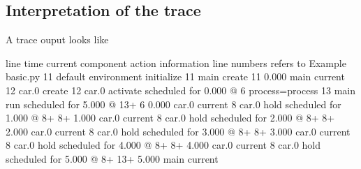 \documentclass[letterpaper,10pt,english]{sphinxmanual}
\begin{document}
\subsection{Interpretation of the trace}
\label{\detokenize{Miscellaneous:interpretation-of-the-trace}}
A trace ouput looks like

\begin{sphinxVerbatim}[commandchars=\\\{\}]
line\PYGZsh{}         time current component    action                               information
\PYGZhy{}\PYGZhy{}\PYGZhy{}\PYGZhy{}\PYGZhy{}   \PYGZhy{}\PYGZhy{}\PYGZhy{}\PYGZhy{}\PYGZhy{}\PYGZhy{}\PYGZhy{}\PYGZhy{}\PYGZhy{}\PYGZhy{} \PYGZhy{}\PYGZhy{}\PYGZhy{}\PYGZhy{}\PYGZhy{}\PYGZhy{}\PYGZhy{}\PYGZhy{}\PYGZhy{}\PYGZhy{}\PYGZhy{}\PYGZhy{}\PYGZhy{}\PYGZhy{}\PYGZhy{}\PYGZhy{}\PYGZhy{}\PYGZhy{}\PYGZhy{}\PYGZhy{} \PYGZhy{}\PYGZhy{}\PYGZhy{}\PYGZhy{}\PYGZhy{}\PYGZhy{}\PYGZhy{}\PYGZhy{}\PYGZhy{}\PYGZhy{}\PYGZhy{}\PYGZhy{}\PYGZhy{}\PYGZhy{}\PYGZhy{}\PYGZhy{}\PYGZhy{}\PYGZhy{}\PYGZhy{}\PYGZhy{}\PYGZhy{}\PYGZhy{}\PYGZhy{}\PYGZhy{}\PYGZhy{}\PYGZhy{}\PYGZhy{}\PYGZhy{}\PYGZhy{}\PYGZhy{}\PYGZhy{}\PYGZhy{}\PYGZhy{}\PYGZhy{}\PYGZhy{}  \PYGZhy{}\PYGZhy{}\PYGZhy{}\PYGZhy{}\PYGZhy{}\PYGZhy{}\PYGZhy{}\PYGZhy{}\PYGZhy{}\PYGZhy{}\PYGZhy{}\PYGZhy{}\PYGZhy{}\PYGZhy{}\PYGZhy{}\PYGZhy{}\PYGZhy{}\PYGZhy{}\PYGZhy{}\PYGZhy{}\PYGZhy{}\PYGZhy{}\PYGZhy{}\PYGZhy{}\PYGZhy{}\PYGZhy{}\PYGZhy{}\PYGZhy{}\PYGZhy{}\PYGZhy{}\PYGZhy{}\PYGZhy{}\PYGZhy{}\PYGZhy{}\PYGZhy{}\PYGZhy{}\PYGZhy{}\PYGZhy{}\PYGZhy{}\PYGZhy{}\PYGZhy{}\PYGZhy{}\PYGZhy{}\PYGZhy{}\PYGZhy{}\PYGZhy{}\PYGZhy{}\PYGZhy{}
                                        line numbers refers to               Example \PYGZhy{} basic.py
   11                                   default environment initialize
   11                                   main create
   11        0.000 main                 current
   12                                   car.0 create
   12                                   car.0 activate                       scheduled for      0.000 @    6  process=process
   13                                   main run                             scheduled for      5.000 @   13+
    6        0.000 car.0                current
    8                                   car.0 hold                           scheduled for      1.000 @    8+
    8+       1.000 car.0                current
    8                                   car.0 hold                           scheduled for      2.000 @    8+
    8+       2.000 car.0                current
    8                                   car.0 hold                           scheduled for      3.000 @    8+
    8+       3.000 car.0                current
    8                                   car.0 hold                           scheduled for      4.000 @    8+
    8+       4.000 car.0                current
    8                                   car.0 hold                           scheduled for      5.000 @    8+
   13+       5.000 main                 current
\end{sphinxVerbatim}
\end{document}
